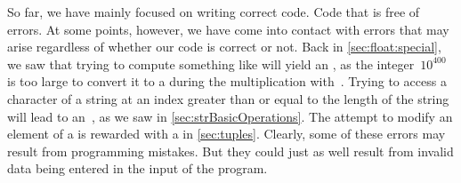 %
%
So far, we have mainly focused on writing correct code.
Code that is free of errors.
At some points, however, we have come into contact with errors that may arise regardless of whether our code is correct or not.
Back in \cref{sec:float:special}, we saw that trying to compute something like  will yield an , as the integer~$10^{400}$ is too large to convert it to a  during the multiplication with~.
Trying to access a character of a string at an index greater than or equal to the length of the string will lead to an~, as we saw in \cref{sec:strBasicOperations}.
The attempt to modify an element of a  is rewarded with a  in \cref{sec:tuples}.
Clearly, some of these errors may result from programming mistakes.
But they could just as well result from invalid data being entered in the input of the program.
%
\endhsection%
%
